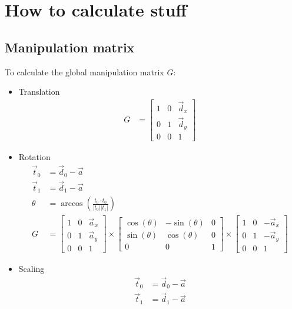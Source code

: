 \documentclass[12pt]{article}
\begin{document}
\section{How to calculate stuff}

\subsection{Manipulation matrix}

To calculate the global manipulation matrix $G$:
\begin{itemize}
  \item Translation
    \begin{align}
      G &= \begin{bmatrix}
        1 & 0 & \vec d_x\\
        0 & 1 & \vec d_y\\
        0 & 0 & 1
      \end{bmatrix}
    \end{align}
  \item Rotation
    \begin{align}
      \vec t_0 &= \vec d_0 - \vec a \\
      \vec t_1 &= \vec d_1 - \vec a \\
      \theta &= \arccos(\frac{t_0 \cdot t_0}{|t_0||t_1|}) \\
      G &= \begin{bmatrix}
        1 & 0 & \vec a_x\\
        0 & 1 & \vec a_y\\
        0 & 0 & 1
      \end{bmatrix} \times
      \begin{bmatrix}
        \cos(\theta) & -\sin(\theta) & 0\\
        \sin(\theta) & \cos(\theta) & 0\\
        0 & 0 & 1
      \end{bmatrix} \times
      \begin{bmatrix}
        1 & 0 & -\vec a_x\\
        0 & 1 & -\vec a_y\\
        0 & 0 & 1
      \end{bmatrix}
    \end{align}
  \item Scaling
    \begin{align}
      \vec t_0 &= \vec d_0 - \vec a \\
      \vec t_1 &= \vec d_1 - \vec a \\

\end{align}
\end{itemize}
\end{document}
